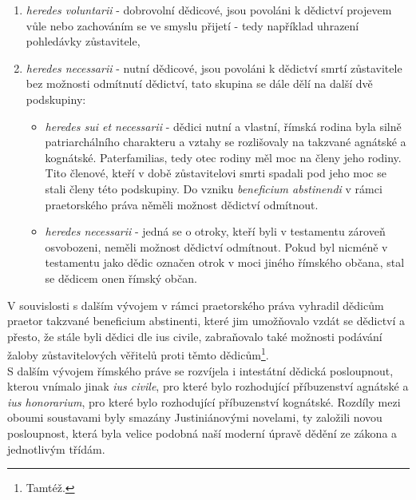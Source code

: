 \documentclass{article}
\begin{document}
\begin{enumerate}
\item \textit{heredes voluntarii} - dobrovolní dědicové, jsou povoláni k dědictví projevem vůle nebo zachováním se ve smyslu přijetí - tedy například uhrazení pohledávky zůstavitele,
\item \textit{heredes necessarii} - nutní dědicové, jsou povoláni k dědictví smrtí zůstavitele bez možnosti odmítnutí dědictví, tato skupina se dále dělí na další dvě podskupiny:
\begin{itemize}
\item \textit{heredes sui et necessarii} - dědici nutní a vlastní, římská rodina byla silně patriarchálního charakteru a vztahy se rozlišovaly na takzvané agnátské a kognátské. Paterfamilias, tedy otec rodiny měl moc na členy jeho rodiny. Tito členové, kteří v době zůstavitelovi smrti spadali pod jeho moc se stali členy této podskupiny. Do vzniku \textit{beneficium abstinendi} v rámci praetorského práva něměli možnost dědictví odmítnout.
\item \textit{heredes necessarii} - jedná se o otroky, kteří byli v testamentu zároveň osvobozeni, neměli možnost dědictví odmítnout. Pokud byl nicméně v testamentu jako dědic označen otrok v moci jiného římského občana, stal se dědicem onen římský občan.
\end{itemize}
\end{enumerate}

\vspace{5 mm}



V souvislosti s dalším vývojem v rámci praetorského práva vyhradil dědicům praetor takzvané beneficium abstinenti, které jim umožňovalo vzdát se dědictví a přesto, že stále byli dědici dle ius civile, zabraňovalo také možnosti podávání žaloby zůstavitelových věřitelů proti těmto dědicům\footnote{Tamtéž.}.\\

S dalším vývojem římského práve se rozvíjela i intestátní dědická posloupnout, kterou vnímalo jinak \textit{ius civile}, pro které bylo rozhodující příbuzenství agnátské a \textit{ius honorarium}, pro které bylo rozhodující příbuzenství kognátské. Rozdíly mezi oboumi soustavami byly smazány Justiniánovými novelami, ty založili novou posloupnost, která byla velice podobná naší moderní úpravě dědění ze zákona a jednotlivým třídám.\\
\end{document}
